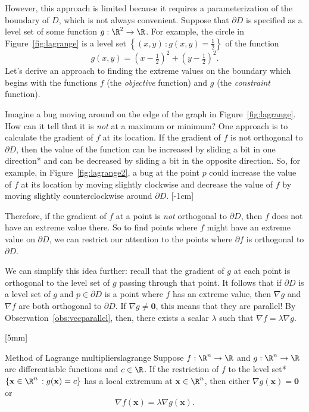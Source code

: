 \documentclass[indent]{watsonbook}
\begin{document}
{However, this approach is limited because it requires a
parameterization of the boundary of $D$, which is not always
convenient. Suppose that $\partial D$ is specified as a level set of
some function $g: \R^2 \to \R$. For example, the
circle in Figure~\ref{fig:lagrange} is a level set $\left\{(x,y) \, :
  g(x,y) = \tfrac{1}{2}\right\}$ of the function
\[
  g(x,y) = \left(x-\tfrac{1}{2}\right)^2 + \left(y-\tfrac{1}{2}\right)^2.
\]
Let's derive an approach to finding the extreme values on the
boundary which begins with the functions $f$ (the \textit{objective}
function) and $g$ (the \textit{constraint} function).


Imagine a bug moving around on the edge of the graph in
Figure~\ref{fig:lagrange}. How can it tell that it is \textit{not} at
a maximum or minimum? One approach is to calculate the gradient of $f$
at its location. If the gradient of $f$ is not orthogonal to
$\partial D$, then the value of the function can be increased by
sliding a bit in one direction* and can be decreased by sliding a bit
in the opposite direction. So, for example, in
Figure~\ref{fig:lagrange2}, a bug at the point $p$ could increase the
value of $f$ at its location by moving slightly clockwise and decrease
the value of $f$ by moving slightly counterclockwise around
$\partial D$. [-1cm]

Therefore, if the gradient of $f$ at a point is \textit{not}
orthogonal to $\partial D$, then $f$ does not have an extreme value
there. So to find points where $f$ might have an extreme value on
$\partial D$, we can restrict our attention to the points where
$\partial f$ is orthogonal to $\partial D$.

We can simplify this idea further: recall that the gradient of $g$ at
each point is orthogonal to the level set of $g$ passing through that
point. It follows that if $\partial D$ is a level set of $g$ and
$p \in \partial D$ is a point where $f$ has an extreme value, then
$\nabla g$ and $\nabla f$ are both orthogonal to $\partial D$. If
$\nabla g \neq \mathbf{0}$, this means that they are parallel! By
Observation~\ref{obs:vecparallel}, then, there exists a scalar
$\lambda$ such that $\nabla f = \lambda \nabla g$.

[5mm]
\begin{theo}{Method of Lagrange multipliers}{lagrange}
  Suppose $f: \R^n \to \R$ and $g:\R^n \to \R$ are differentiable
  functions and $c \in \R$. If the restriction of $f$ to the level
  set* $\{\mathbf{x} \in \R^n \,: g(\mathbf{x}) = c\}$ has a local
  extremum at $\mathbf{x} \in \R^n$, then either $\nabla g(\mathbf{x}) =
  \mathbf{0}$ or
  \[
    \nabla f (\mathbf{x}) = \lambda \nabla g (\mathbf{x}).
  \]
\end{theo}

}
\end{document}
